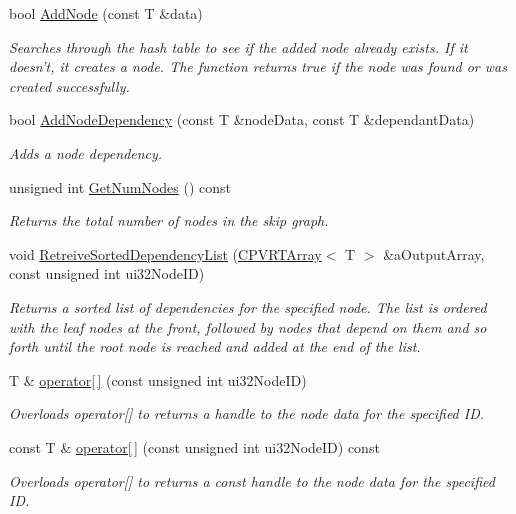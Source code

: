 \begin{DoxyCompactItemize}
\item 
bool \hyperlink{class_c_p_v_r_t_skip_graph_root_abeeb3998b214bf466817636d0170cc0a}{Add\+Node} (const T \&data)
\begin{DoxyCompactList}\small\item\em Searches through the hash table to see if the added node already exists. If it doesn't, it creates a node. The function returns true if the node was found or was created successfully. \end{DoxyCompactList}\item 
bool \hyperlink{class_c_p_v_r_t_skip_graph_root_a534206c4337eb2efa043f321fffb9b6f}{Add\+Node\+Dependency} (const T \&node\+Data, const T \&dependant\+Data)
\begin{DoxyCompactList}\small\item\em Adds a node dependency. \end{DoxyCompactList}\item 
unsigned int \hyperlink{class_c_p_v_r_t_skip_graph_root_a6e143b818143da36c266a67814ed3b1e}{Get\+Num\+Nodes} () const 
\begin{DoxyCompactList}\small\item\em Returns the total number of nodes in the skip graph. \end{DoxyCompactList}\item 
void \hyperlink{class_c_p_v_r_t_skip_graph_root_a30ac3d24c0e863662b41009440a84d99}{Retreive\+Sorted\+Dependency\+List} (\hyperlink{class_c_p_v_r_t_array}{C\+P\+V\+R\+T\+Array}$<$ T $>$ \&a\+Output\+Array, const unsigned int ui32\+Node\+I\+D)
\begin{DoxyCompactList}\small\item\em Returns a sorted list of dependencies for the specified node. The list is ordered with the leaf nodes at the front, followed by nodes that depend on them and so forth until the root node is reached and added at the end of the list. \end{DoxyCompactList}\item 
T \& \hyperlink{class_c_p_v_r_t_skip_graph_root_a19009a66d8615fc617bd87ad04bc97fc}{operator\mbox{[}$\,$\mbox{]}} (const unsigned int ui32\+Node\+I\+D)
\begin{DoxyCompactList}\small\item\em Overloads operator\mbox{[}\mbox{]} to returns a handle to the node data for the specified I\+D. \end{DoxyCompactList}\item 
const T \& \hyperlink{class_c_p_v_r_t_skip_graph_root_a22bea969fde68c9df3a50524af789ffe}{operator\mbox{[}$\,$\mbox{]}} (const unsigned int ui32\+Node\+I\+D) const 
\begin{DoxyCompactList}\small\item\em Overloads operator\mbox{[}\mbox{]} to returns a const handle to the node data for the specified I\+D. \end{DoxyCompactList}\end{DoxyCompactItemize}


